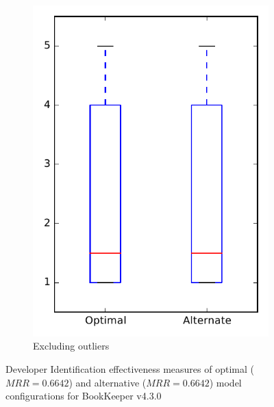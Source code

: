 \begin{figure}
\begin{subfigure}{.4\textwidth}
        \includegraphics[height=0.4\textheight]{figures/combo/dit_rq1_bookkeeper_no_outlier}
        \caption{Excluding outliers}\label{fig:combo:dit:rq1:bookkeeper_no_outlier}
    \end{subfigure}
\caption[Developer Identification effectiveness measures of optimal and alternative model configurations for BookKeeper v4.3.0]%
{Developer Identification effectiveness measures of optimal ($MRR=0.6642$) and alternative ($MRR=0.6642$) model configurations for BookKeeper v4.3.0}
\label{fig:combo:dit:rq1:bookkeeper}
\end{figure}
